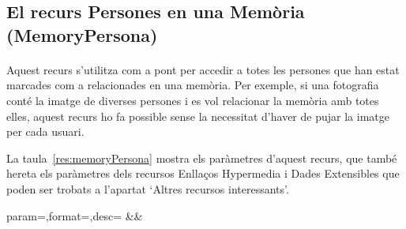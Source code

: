 \subsection{El recurs Persones en una Memòria (MemoryPersona)}

    \paragraph{}
    Aquest recurs s'utilitza com a pont per accedir a totes les persones que han estat marcades com a relacionades en una memòria. Per exemple, si una fotografia conté la imatge de diverses persones i es vol relacionar la memòria amb totes elles, aquest recurs ho fa possible sense la necessitat d'haver de pujar la imatge per cada usuari.

    La taula~\ref{res:memoryPersona} mostra els paràmetres d'aquest recurs, que també hereta els paràmetres dels recursos Enllaços Hypermedia i Dades Extensibles que poden ser trobats a l'apartat `Altres recursos interessants'.

    \begin{center}
             {param=\param,format=\format,desc=\desc}
             {\param&\format&\desc}
     \end{center}
